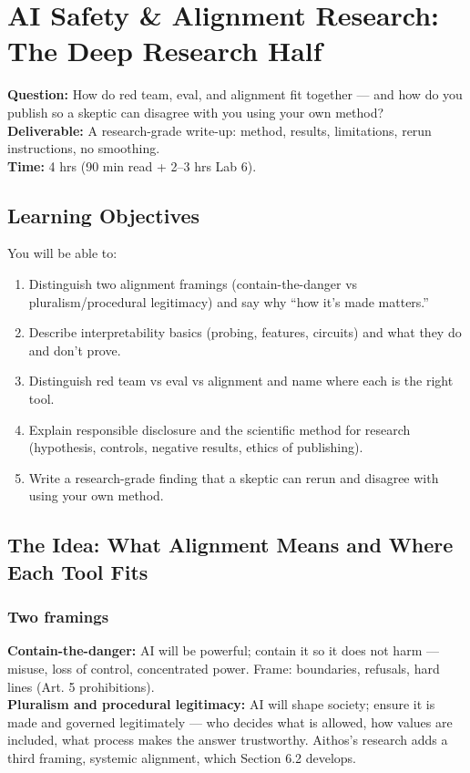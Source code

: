 \chapter{AI Safety \& Alignment Research: The Deep Research Half}
\label{ch:6}

\begin{tcolorbox}[colback=white,colframe=checkblack,title=Chapter 6 at a Glance,fonttitle=\bfseries,sharp corners,boxrule=1pt]
\textbf{Question:} How do red team, eval, and alignment fit together — and how do you publish so a skeptic can disagree with you using your own method?\\
\textbf{Deliverable:} A research-grade write-up: method, results, limitations, rerun instructions, no smoothing.\\
\textbf{Time:} 4 hrs (90 min read + 2–3 hrs Lab 6).
\end{tcolorbox}

\section{Learning Objectives}
\fbadge
You will be able to:
\begin{enumerate}
\item Distinguish two alignment framings (contain-the-danger vs pluralism/procedural legitimacy) and say why ``how it's made matters.''
\item Describe interpretability basics (probing, features, circuits) and what they do and don't prove.
\item Distinguish red team vs eval vs alignment and name where each is the right tool.
\item Explain responsible disclosure and the scientific method for research (hypothesis, controls, negative results, ethics of publishing).
\item Write a research-grade finding that a skeptic can rerun and disagree with using your own method.
\end{enumerate}

\section{The Idea: What Alignment Means and Where Each Tool Fits}
\tierF

\subsection{Two framings}
\textbf{Contain-the-danger:} AI will be powerful; contain it so it does not harm — misuse, loss of control, concentrated power. Frame: boundaries, refusals, hard lines (Art. 5 prohibitions).\\
\textbf{Pluralism and procedural legitimacy:} AI will shape society; ensure it is made and governed legitimately — who decides what is allowed, how values are included, what process makes the answer trustworthy. Aithos's research adds a third framing, systemic alignment, which Section 6.2 develops.

